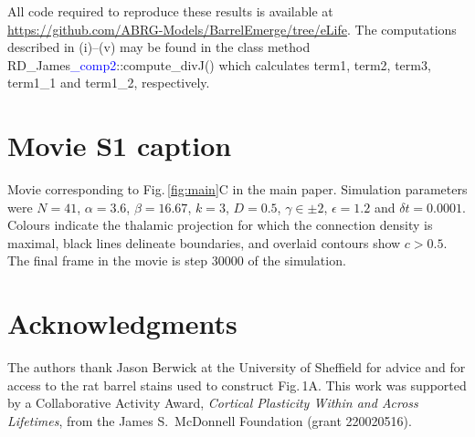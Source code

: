 \documentclass[9pt,lineno,draft]{elife}
\newcommand{\cmnt}[1]{\textcolor{blue}{#1}}
\newcommand{\code}[1]{\textsf{#1}}
\begin{document}
All code required to reproduce these results is available at
\url{https://github.com/ABRG-Models/BarrelEmerge/tree/eLife}. The computations
described in (i)--(v) may be found in the class method
\code{RD\_James\cmnt{\_comp2}::compute\_divJ()} which calculates \code{term1},
\code{term2}, \code{term3}, \code{term1\_1} and \code{term1\_2}, respectively.

\section{Movie S1 caption}

Movie corresponding to Fig.\,\ref{fig:main}C in the main paper. Simulation parameters were
$N=41$, $\alpha=3.6$, $\beta=16.67$, $k=3$, $D=0.5$, $\gamma\in\pm 2$,
$\epsilon=1.2$ and $\delta{t}=0.0001$. Colours indicate the thalamic
projection for which the connection density is maximal, black lines delineate
boundaries, and overlaid contours show $c>0.5$. The final frame in the movie
is step $30000$ of the simulation.

\section{Acknowledgments}

The authors thank Jason Berwick at the University of Sheffield for advice and
for access to the rat barrel stains used to construct Fig.\,1A. This work was
supported by a Collaborative Activity Award, \emph{Cortical Plasticity Within
  and Across Lifetimes}, from the James S.~McDonnell Foundation (grant
220020516).


\end{document}
